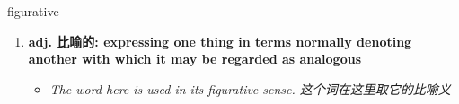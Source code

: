 
\begin{frame}
{\huge figurative}
\begin{center}
\begin{enumerate}\Large
  \item \textbf{adj. 比喻的: expressing one thing in terms normally denoting another with which it may be regarded as analogous}
  \begin{itemize}
    \item \em{\Large{The word here is used in its figurative sense. 这个词在这里取它的比喻义}}
  \end{itemize}
\end{enumerate}
\end{center}
\end{frame}
